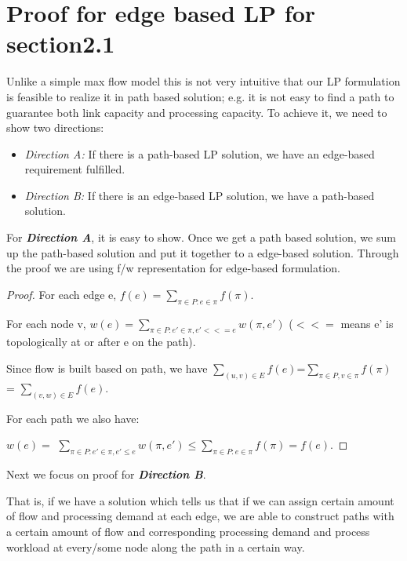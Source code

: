 \documentclass[twoside,leqno, 11pt]{article}
\begin{document}
\section{Proof for edge based LP for section2.1}
Unlike a simple max flow model this is not very intuitive that our LP formulation is feasible to realize it in path based solution; e.g. it is not easy to find a path to guarantee both link capacity and processing capacity. To achieve it, we need to show two directions:
\begin{itemize}
  \item {\textit{Direction A:} If there is a path-based LP solution, we have an edge-based requirement fulfilled.}
  \item {\textit{Direction B:} If there is an edge-based LP solution, we have a path-based solution.}
\end{itemize}
For \textbf{\textit{Direction A}}, it is easy to show. Once we get a path based solution, we sum up the path-based solution and put it together to a edge-based solution. Through the proof we are using f/w representation for edge-based formulation.

\begin{proof}

For each edge e, $f(e) =\sum\limits_{\pi\in P: e\in \pi} f(\pi)$.

For each node v, $w(e) = \sum\limits_{\pi\in P: e'\in \pi, e' <<= e} w(\pi, e')$ ($<<=$ means e' is topologically at or after e on the path).

Since flow is built based on path, we have $ \sum\limits_{(u,v)\in E} f(e) $=$ \sum\limits_{\pi\in P, v\in \pi} f(\pi)$ = $\sum\limits_{(v,w )\in E} f(e)$.

For each path we also have:

$w(e) =$ 
$ \sum\limits_{\pi\in P: e'\in \pi, e' \leq e} w(\pi, e')\leq \sum\limits_{\pi\in P: e\in \pi} f(\pi) = f(e).  $\newline
\end{proof}
   
Next we focus on proof for \textbf{\textit{Direction B}}.

That is, if we have a solution which tells us that if we can assign certain amount of flow and processing 
demand at each edge, we are able to construct paths with a certain amount of flow 
and corresponding processing demand and process workload at every/some node along the path in a certain way.
\end{document}
